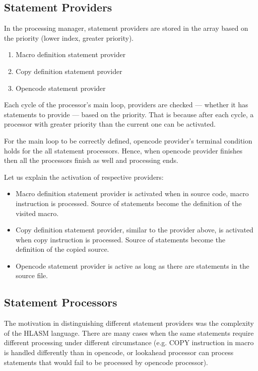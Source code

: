 \subsection{Statement Providers}

In the processing manager, statement providers are stored in the array based on the priority (lower index, greater priority).

\begin{enumerate}
	\item Macro definition statement provider
	\item Copy definition statement provider
	\item Opencode statement provider
\end{enumerate}

Each cycle of the processor's main loop, providers are checked --- whether it has statements to provide --- based on the priority. That is because after each cycle, a processor with greater priority than the current one can be activated. 

For the main loop to be correctly defined, opencode provider's terminal condition holds for the all statement processors. Hence, when opencode provider finishes then all the processors finish as well and processing ends.

Let us explain the activation of respective providers:
\begin{itemize}
	\item Macro definition statement provider is activated when in source code, macro instruction is processed. Source of statements become the definition of the visited macro.
	\item Copy definition statement provider, similar to the provider above, is activated when copy instruction is processed. Source of statements become the definition of the copied source.
	\item Opencode statement provider is active as long as there are statements in the source file.
\end{itemize}

\subsection{Statement Processors}

The motivation in distinguishing different statement providers was the complexity of the HLASM language. There are many cases when the same statements require different processing under different circumstance (e.g. COPY instruction in macro is handled differently than in opencode, or lookahead processor can process statements that would fail to be processed by opencode processor).

